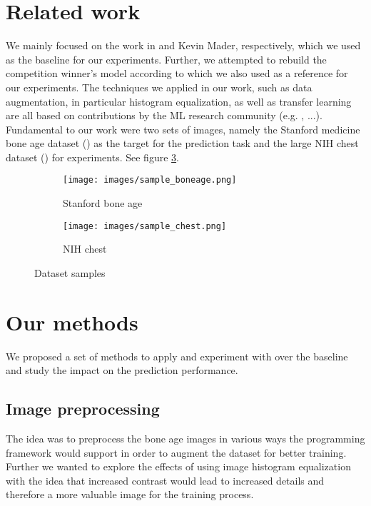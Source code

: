 \documentclass[10pt,twocolumn,letterpaper]{article}
\begin{document}
\section{Related work}
We mainly focused on the work in \cite{kaggleboneage} and Kevin Mader, respectively, which we used as the baseline for our experiments. Further, we attempted to rebuild the competition winner's model according to \cite{16bitrsnachallenge} which we also used as a reference for our experiments. The techniques we applied in our work, such as data augmentation, in particular histogram equalization, as well as transfer learning are all based on contributions by the ML research community (e.g. \cite{1411.1792}, ...). \\
Fundamental to our work were two sets of images, namely the Stanford medicine bone age dataset (\cite{stanfordboneage}) as the target for the prediction task and the large NIH chest dataset (\cite{nihchestxray}) for experiments. See figure \ref{fig:imgdss}.

\begin{figure}[h]
\centering
\begin{subfigure}{0.2\textwidth}
\texttt{[image: images/sample\_boneage.png]} 
\caption{Stanford bone age}
\label{fig:subim1}
\end{subfigure}
\begin{subfigure}{0.2\textwidth}
\texttt{[image: images/sample\_chest.png]}
\caption{NIH chest}
\label{fig:subim2}
\end{subfigure}
\caption{Dataset samples}
\label{fig:imgdss}
\end{figure}


\section{Our methods}
We proposed a set of methods to apply and experiment with over the baseline and study the impact on the prediction performance.

\subsection{Image preprocessing}
The idea was to preprocess the bone age images in various ways the programming framework would support in order to augment the dataset for better training. Further we wanted to explore the effects of using image histogram equalization with the idea that increased contrast would lead to increased details and therefore a more valuable image for the training process.
\end{document}
